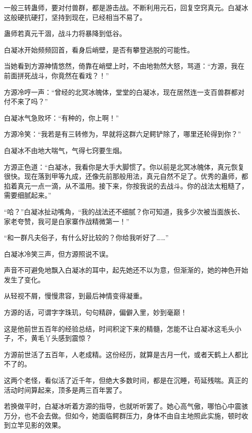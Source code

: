 
\begin{this_body}



一般三转蛊师，要对付兽群，都是游击战。不断利用元石，回复空窍真元。白凝冰这般硬抗硬打，坚持到现在，已经相当不易了。

蛊师若真元干涸，战斗力将暴降到低谷。

白凝冰开始频频回首，看身后峭壁，是否有攀登逃脱的可能性。

当她看到方源神情悠然，倚靠在峭壁上时，不由地勃然大怒，骂道：“方源，我在前面拼死战斗，你竟然在看戏？！”

方源冷哼一声：“曾经的北冥冰魄体，堂堂的白凝冰，现在居然连一支百兽群都对付不来了吗？”

白凝冰气急败坏：“有种的，你上啊！”

方源冷笑：“我若是有三转修为，早就将这群六足鳄铲除了，哪里还轮得到你？”

白凝冰不由地大喘气，气得七窍要生烟。

方源正色道：“白凝冰，我看你是大手大脚惯了。你以前是北冥冰魄体，真元恢复很快。现在落到甲等九成，还像先前那般用法，真元自然不足了。优秀的蛊师，都掐着真元一点一滴，从不滥用。接下来，你按我说的去战斗。你的战法太粗糙了，需要细腻起来。”

“哈？”白凝冰扯动嘴角，“我的战法还不细腻？你可知道，我多少次被当面族长、家老夸赞，我可是白家寨作战精微第一！”

“和一群凡夫俗子，有什么好比较的？你给我听好了……”

白凝冰冷笑三声，但方源照说不误。

声音不可避免地飘入白凝冰的耳中，起先她还不以为意，但渐渐的，她的神色开始发生了变化。

从轻视不屑，慢慢肃容，到最后神情变得凝重。

方源的话，可谓字字珠玑，句句精辟，偏僻入里，妙到毫巅！

这是他前世五百年的经验总结，时间积淀下来的精髓，怎能不让白凝冰这毛头小子，不，黄毛丫头感到震惊？

方源前世活了五百年，人老成精。这份经历，就算是古月一代，或者天鹤上人都比不了的。

这两个老怪，看似活了近千年，但绝大多数时间，都是在沉睡，苟延残喘。真正的活动时间算起来，顶多是两三百年罢了。

若换做平时，白凝冰听着方源的指导，也就听听罢了。她心高气傲，哪怕心中震骇万分，也不会去做。但如今，她面临鳄群压力，身体不由自主地照此实施，顿时收到立竿见影的效果。


\end{this_body}
